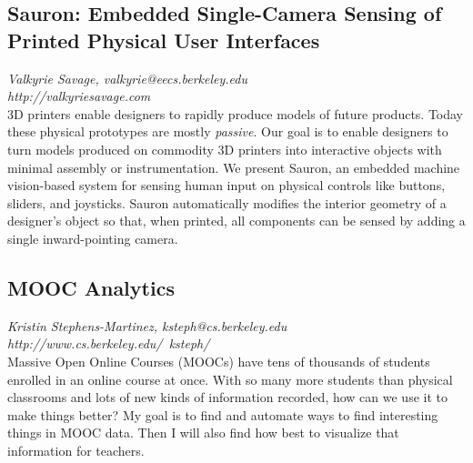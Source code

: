 \documentclass[foldmark,10pt,a4paper,notumble]{leaflet}
\begin{document}
\subsection{Sauron: Embedded Single-Camera Sensing of Printed Physical User Interfaces}
\emph{Valkyrie Savage, valkyrie@eecs.berkeley.edu}\\
\emph{http://valkyriesavage.com}\\
3D printers enable designers to rapidly produce models of future products.  Today these physical prototypes are mostly \emph{passive}.  Our goal is to enable designers to turn models produced on commodity 3D printers into interactive objects with minimal assembly or instrumentation.  We present Sauron, an embedded machine vision-based system for sensing human input on physical controls like buttons, sliders, and joysticks.  Sauron automatically modifies the interior geometry of a designer's object so that, when printed, all components can be sensed by adding a single inward-pointing camera.
\subsection{MOOC Analytics}
\emph{Kristin Stephens-Martinez, ksteph@cs.berkeley.edu}\\
\emph{http://www.cs.berkeley.edu/~ksteph/}\\
Massive Open Online Courses (MOOCs) have tens of thousands of students enrolled in an online course at once. With so many more students than physical classrooms and lots of new kinds of information recorded, how can we use it to make things better? My goal is to find and automate ways to find interesting things in MOOC data. Then I will also find how best to visualize that information for teachers.
\end{document}
